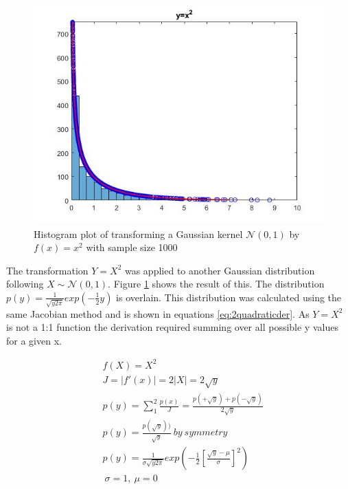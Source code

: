 \documentclass[twoside,twocolumn]{article}
\begin{document}
\begin{figure}[h]
  \centering
    \includegraphics[width=\linewidth]{2quadratic}
  \caption{Histogram plot of transforming a Gaussian kernel $\mathcal{N}(0,1)$ by $f(x)=x^2$ with sample size 1000}
  \label{fig:2quadratic}
\end{figure}

The transformation $Y=X^2$ was applied to another Gaussian distribution following $X\sim\mathcal{N}(0,1)$. Figure \ref{fig:2quadratic} shows the result of this. The distribution $p(y)=\frac{1}{\sqrt{y2\pi}}exp(-\frac{1}{2}y)$ is overlain. This distribution was calculated using the same Jacobian method and is shown in equations \ref{eq:2quadraticder}. As $Y=X^2$ is not a 1:1 function the derivation required summing over all possible y values for a given x.


\begin{equation}
\label{eq:2quadraticder}
\begin{split}
&f(X)=X^2\\
&J=|f'(x)|=2|X|=2\sqrt{y}\\
&p(y) = \sum_{1}^{2} \frac{p(x)}{J} = \frac{p(+\sqrt{y})+p(-\sqrt{y})}{2\sqrt{y}}\\
&p(y)=\frac{p(\sqrt{y}))}{\sqrt{y}}\: by\:symmetry\\
&p(y)=\frac{1}{\sigma\sqrt{y2\pi}}exp(-\frac{1}{2}[\frac{\sqrt{y}-\mu}{\sigma}]^2)\\
&\:\sigma=1,\:\mu=0\\ 
\end{split}
\end{equation} 
\end{document}
